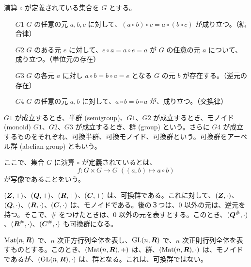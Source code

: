 \setcounter{page}{0}
\maketitle

\newpage
{}
\begin{definition}
演算 $\circ$ が定義されている集合を $G$ とする。
\begin{itemize}
\item[$G1$] $G$  の任意の元 $a, b, c$ に対して、$(a\circ b)\circ c = a\circ(b\circ c)$ が成り立つ。（結合律）
\item[$G2$] $G$ のある元 $e$ に対して、$e\circ a = a\circ e = a$ が $G$ の任意の元 $a$ について、成り立つ。（単位元の存在）
\item[$G3$] $G$ の各元 $a$ に対し $a\circ b = b\circ a = e$ となる $G$ の元 $b$ が存在する。（逆元の存在）
\item[$G4$] $G$ の任意の元 $a, b$ に対して、$a\circ b = b\circ a$ が、成り立つ。（交換律）
\end{itemize}
$G1$ が成立するとき、半群 (semigroup)、$G1$、$G2$ が成立するとき、モノイド (monoid)  $G1$、$G2$、$G3$ が成立するとき、群 (group) という。さらに $G4$ が成立するものをそれぞれ、可換半群、可換モノイド、可換群という。可換群をアーベル群 (abelian group) ともいう。
\end{definition}

\note
ここで、集合 $G$ に演算 $\circ$ が定義されているとは、
$$f:G \times G \to G\;((a, b)\mapsto a\circ b)$$
が写像であることをいう。

\begin{eg}
$(\mbox{\boldmath $Z$}, +)$、$(\mbox{\boldmath $Q$}, +)$、$(\mbox{\boldmath $R$}, +)$、$(\mbox{\boldmath $C$}, +)$ は、可換群である。これに対して、$(\mbox{\boldmath $Z$}, \cdot)$、$(\mbox{\boldmath $Q$}, \cdot)$、$(\mbox{\boldmath $R$}, \cdot)$、$(\mbox{\boldmath $C$}, \cdot)$ は、モノイドである。後の３つは、$0$ 以外の元は、逆元を持つ。そこで、$\#$ をつけたときは、$0$ 以外の元を表すとする。このとき、$(\mbox{\boldmath $Q$}^{\#}, \cdot)$、$(\mbox{\boldmath $R$}^{\#}, \cdot)$、$(\mbox{\boldmath $C$}^{\#}, \cdot)$ も可換群になる。
\end{eg}

\begin{eg}
$\mbox{{\rm Mat}}(n,\mbox{\boldmath $R$})$ で、$n$ 次正方行列全体を表し、$\mbox{{\rm GL}}(n,\mbox{\boldmath $R$})$ で、$n$ 次正則行列全体を表すものとする。このとき、$(\mbox{{\rm Mat}}(n,\mbox{\boldmath $R$}), +)$ は、群、$(\mbox{{\rm Mat}}(n,\mbox{\boldmath $R$}), \cdot)$ は、モノイドであるが、$(\mbox{{\rm GL}}(n,\mbox{\boldmath $R$}), \cdot)$ は、群となる。これは、可換群ではない。
\end{eg}

